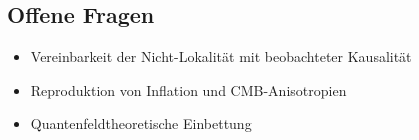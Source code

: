 \subsection{Offene Fragen}
\begin{itemize}
\item Vereinbarkeit der Nicht-Lokalität mit beobachteter Kausalität
\item Reproduktion von Inflation und CMB-Anisotropien
\item Quantenfeldtheoretische Einbettung
\end{itemize}